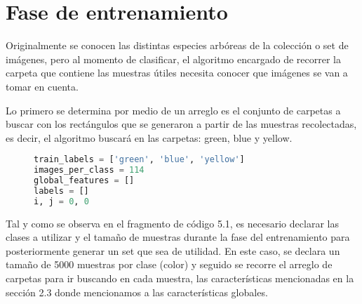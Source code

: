 \section{Fase de entrenamiento}
Originalmente se conocen las distintas especies arbóreas de la colección o set de imágenes, pero al momento de clasificar, el algoritmo encargado de recorrer la carpeta que contiene las muestras útiles  necesita conocer que imágenes se van a tomar en cuenta. 

Lo primero se determina por medio de un arreglo es el conjunto de carpetas a buscar con los rectángulos que se generaron a partir de las muestras recolectadas, es decir, el algoritmo buscará en las carpetas: green, blue y yellow. 

\begin{figure}[H]
\centering
\begin{lstlisting}[basicstyle=\small, language=Python, caption=Declaración de variables]
train_labels = ['green', 'blue', 'yellow']
images_per_class = 114 
global_features = []
labels = []
i, j = 0, 0
\end{lstlisting}
\label{Declaracion-variables}
\end{figure}


Tal y como se observa en el fragmento de código 5.1, es necesario declarar las clases a utilizar y el tamaño de muestras durante la fase del entrenamiento para posteriormente generar un set que sea de utilidad. En este caso, se declara un tamaño de 5000 muestras por clase (color) y seguido se recorre el arreglo de carpetas para ir buscando en cada muestra, las características mencionadas en la sección 2.3 donde mencionamos a las características globales.


